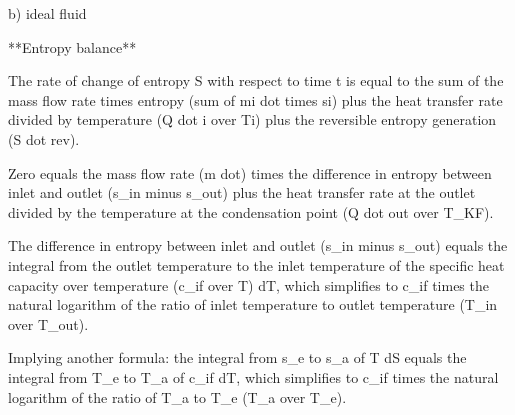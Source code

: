 b) ideal fluid

**Entropy balance**

The rate of change of entropy S with respect to time t is equal to the sum of the mass flow rate times entropy (sum of mi dot times si) plus the heat transfer rate divided by temperature (Q dot i over Ti) plus the reversible entropy generation (S dot rev).

Zero equals the mass flow rate (m dot) times the difference in entropy between inlet and outlet (s_in minus s_out) plus the heat transfer rate at the outlet divided by the temperature at the condensation point (Q dot out over T_KF).

The difference in entropy between inlet and outlet (s_in minus s_out) equals the integral from the outlet temperature to the inlet temperature of the specific heat capacity over temperature (c_if over T) dT, which simplifies to c_if times the natural logarithm of the ratio of inlet temperature to outlet temperature (T_in over T_out).

Implying another formula: the integral from s_e to s_a of T dS equals the integral from T_e to T_a of c_if dT, which simplifies to c_if times the natural logarithm of the ratio of T_a to T_e (T_a over T_e).
